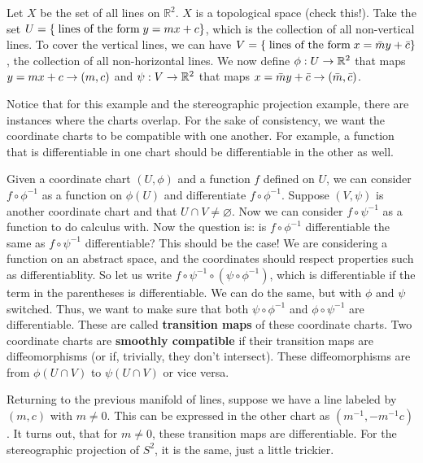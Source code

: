\documentclass{../mathnotes}
\begin{document}
\begin{exmp}
    Let $X$ be the set of all lines on $\mathbb{R}^2$. $X$ is a topological space (check this!). Take the set $U=\left\{ \;\textnormal{lines of the form}\; y=mx+c \right\}$,
    which is the collection of all non-vertical lines. To cover the vertical lines, we can have $V=\left\{ \;\textnormal{lines of the form}\;x=\bar{m}y+\bar{c} \right\}$,
    the collection of all non-horizontal lines. We now define $\phi:U\rightarrow\mathbb{R}^2$ that maps $y=mx+c\rightarrow(m,c)$ and $\psi:V\rightarrow\mathbb{R}^2$ that maps
    $x=\bar{m}y+\bar{c}\rightarrow(\bar{m},\bar{c})$.
\end{exmp}

Notice that for this example and the stereographic projection example, there are instances where the charts overlap. For the sake of consistency, we want
the coordinate charts to be compatible with one another. For example, a function that is differentiable in one chart should be differentiable in the other
as well.

\begin{defn}
    Given a coordinate chart $(U,\phi)$ and a function $f$ defined on $U$, we can consider $f\circ \phi^{-1}$ as a function on $\phi(U)$ and differentiate
    $f\circ \phi^{-1}$. Suppose $(V,\psi)$ is another coordinate chart and that $U\cap V\neq \varnothing$. Now we can consider $f\circ\psi^{-1}$ as a function
    to do calculus with. Now the question is: is $f\circ \phi^{-1}$ differentiable the same as $f\circ\psi^{-1}$ differentiable? This should be the case!
    We are considering a function on an abstract space, and the coordinates should respect properties such as differentiablity. So let us write
    $f\circ\psi^{-1}\circ(\psi\circ\phi^{-1})$, which is differentiable if the term in the parentheses is differentiable. We can do the same, but with
    $\phi$ and $\psi$ switched. Thus, we want to make sure that both $\psi\circ\phi^{-1}$ and $\phi\circ\psi^{-1}$ are differentiable. These are called
    \textbf{transition maps} of these coordinate charts. Two coordinate charts are \textbf{smoothly compatible} if their transition maps are diffeomorphisms
    (or if, trivially, they don't intersect). These diffeomorphisms are from $\phi(U\cap V)$ to $\psi(U\cap V)$ or vice versa.
\end{defn}

Returning to the previous manifold of lines, suppose we have a line labeled by $(m,c)$ with $m\neq 0$. This can be expressed in the other chart as
$(m^{-1},-m^{-1}c)$. It turns out, that for $m\neq 0$, these transition maps are differentiable. For the stereographic projection of $S^2$, it is the same,
just a little trickier.
\end{document}
